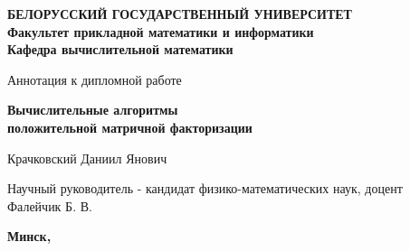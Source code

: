 \begin{titlepage}

  \begin{center}
    \textbf{БЕЛОРУССКИЙ ГОСУДАРСТВЕННЫЙ УНИВЕРСИТЕТ} \\
    \textbf{Факультет прикладной математики и информатики} \\
    \textbf{Кафедра вычислительной математики}
  \end{center}

  \vfill

  \begin{center}
    Аннотация к дипломной работе
  \end{center}


  \begin{center}
    \textbf{Вычислительные алгоритмы} \\
    \textbf{положительной матричной факторизации}
  \end{center}

  \vspace{1cm}

  \begin{center}
    Крачковский Даниил Янович
  \end{center}

  \vspace{1.5cm}

  \begin{center}
    Научный руководитель -
    кандидат физико-математических наук, доцент \\ Фалейчик Б. В.
  \end{center}

  \vfill

  \begin{center}
    \textbf{
      Минск, \the\year
    }
  \end{center}

\end{titlepage}
